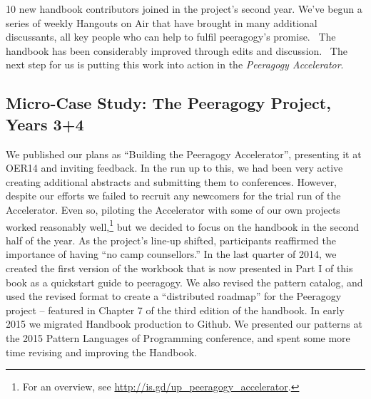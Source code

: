 10 new handbook contributors joined in the project's second year. We've
begun a series of weekly Hangouts on Air that have brought in many
additional discussants, all key people who can help to fulfil
peeragogy's promise.~ The handbook has been considerably improved
through edits and discussion.~ The next step for us is putting this work
into action in the \emph{Peeragogy Accelerator}.

\subsection{{\small {Micro-}Case Study: The Peeragogy Project, Years
3+4}}\label{micro-case-study-the-peeragogy-project-year-3}

We published our plans as ``Building the Peeragogy Accelerator'',
presenting it at OER14 and inviting feedback. In the run up to this, we
had been very active creating additional abstracts and submitting them
to conferences. However, despite our efforts we failed to recruit any
newcomers for the trial run of the Accelerator. Even so, piloting the
Accelerator with some of our own projects worked reasonably
well,\footnote{For an overview, see
  \url{http://is.gd/up_peeragogy_accelerator}.} but we decided to focus
on the handbook in the second half of the year. As the project's line-up
shifted, participants reaffirmed the importance of having ``no camp
counsellors.'' In the last quarter of 2014, we created the first version of the
workbook that is now presented in Part I of this book as a quickstart guide to
peeragogy.  We also revised the pattern catalog, and used the revised format to create a
``distributed roadmap'' for the Peeragogy project -- featured in Chapter
7 of the third edition of the handbook.  In early 2015 we migrated
Handbook production to Github.  We presented our patterns at
the 2015 Pattern Languages of Programming conference, and spent some
more time revising and improving the Handbook.
